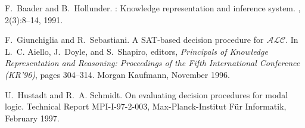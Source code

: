 \documentclass[12pt,titlepage]{article}
\begin{document}
\newpage
{}
\begin{thebibliography}{BH91}

F.~Baader and B.~Hollunder.
: Knowledge representation and inference system.
, 2(3):8--14, 1991.

F.~Giunchiglia and R.~Sebastiani.
\newblock A {SAT}-based decision procedure for $\mathcal{ALC}$.
\newblock In L.~C. Aiello, J.~Doyle, and S.~Shapiro, editors, {\em Principals
  of Knowledge Representation and Reasoning: Proceedings of the Fifth
  International Conference (KR'96)}, pages 304--314. Morgan Kaufmann, November
  1996.

U.~Hustadt and R.~A. Schmidt.
\newblock On evaluating decision procedures for modal logic.
\newblock Technical Report MPI-I-97-2-003, Max-Planck-Institut F\"ur
  Informatik, February 1997.

\end{thebibliography}

%
%

\printindex
\end{document}
